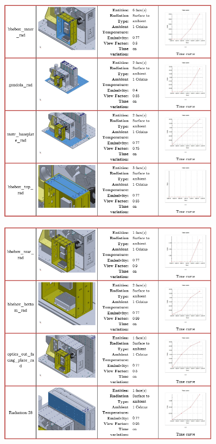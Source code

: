 \begin{figure}
    \centering
    \includegraphics[width=\textwidth]{thermal_load_images/sunrise_TL_images/sunrise_9.PNG}
\end{figure}

\begin{figure}
    \centering
    \includegraphics[width=\textwidth]{thermal_load_images/sunrise_TL_images/sunrise_10.PNG}
\end{figure}

